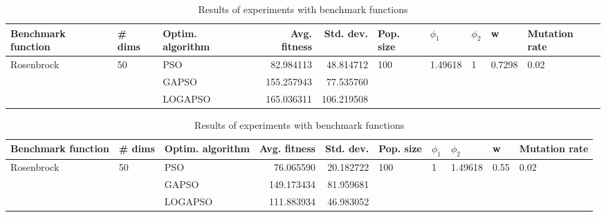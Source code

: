 \documentclass{article}
\begin{document}
\begin{table}
\centering
\caption{Results of experiments with benchmark functions}
\begin{tabular}{lllrrlllll}
\toprule
         Benchmark function &             \# dims & Optim. algorithm &  Avg. fitness &  Std. dev. &            Pop. size &               $\phi_{1}$ &         $\phi_{2}$ &                       w &         Mutation rate \\
\midrule
\multirow{3}{*}{Rosenbrock} & \multirow{3}{*}{50} &              PSO &     82.984113 &  48.814712 & \multirow{3}{*}{100} & \multirow{3}{*}{1.49618} & \multirow{3}{*}{1} & \multirow{3}{*}{0.7298} & \multirow{3}{*}{0.02} \\
                            &                     &            GAPSO &    155.257943 &  77.535760 &                      &                          &                    &                         &                       \\
                            &                     &          LOGAPSO &    165.036311 & 106.219508 &                      &                          &                    &                         &                       \\
\bottomrule
\end{tabular}
\end{table}
\begin{table}
\centering
\caption{Results of experiments with benchmark functions}
\begin{tabular}{lllrrlllll}
\toprule
         Benchmark function &             \# dims & Optim. algorithm &  Avg. fitness &  Std. dev. &            Pop. size &         $\phi_{1}$ &               $\phi_{2}$ &                     w &         Mutation rate \\
\midrule
\multirow{3}{*}{Rosenbrock} & \multirow{3}{*}{50} &              PSO &     76.065590 &  20.182722 & \multirow{3}{*}{100} & \multirow{3}{*}{1} & \multirow{3}{*}{1.49618} & \multirow{3}{*}{0.55} & \multirow{3}{*}{0.02} \\
                            &                     &            GAPSO &    149.173434 &  81.959681 &                      &                    &                          &                       &                       \\
                            &                     &          LOGAPSO &    111.883934 &  46.983052 &                      &                    &                          &                       &                       \\
\bottomrule
\end{tabular}
\end{table}
\end{document}

